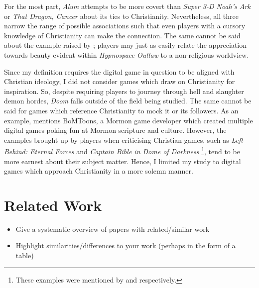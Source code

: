 For the most part, \textit{Alum} attempts to be more covert than \textit{Super 3-D Noah's Ark} \parencite{wisdom_tree_super_2014} or \textit{That Dragon, Cancer} \parencite{numinous_games_that_2016} about its ties to Christianity. Nevertheless, all three narrow the range of possible associations such that even players with a cursory knowledge of Christianity can make the connection. The same cannot be said about the example raised by \textcite{hartgrove_why_2022}; players may just as easily relate the appreciation towards beauty evident within \textit{Hypnospace Outlaw} \parencite{tholen_hypnospace_2019} to a non-religious worldview.

Since my definition requires the digital game in question to be aligned with Christian ideology, I did not consider games which draw on Christianity for inspiration. So, despite requiring players to journey through hell and slaughter demon hordes, \textit{Doom} \parencite{id_software_doom_1993} falls outside of the field being studied. The same cannot be said for games which reference Christianity to mock it or its followers. As an example, \textcite[120]{gonzalez_born-again_2014} mentions BoMToons, a Mormon game developer which created multiple digital games poking fun at Mormon scripture and culture. However, the examples brought up by players when criticising Christian games, such as \textit{Left Behind: Eternal Forces} \parencite{inspired_media_entertainment_left_2006} and \textit{Captain Bible in Dome of Darkness} \parencite{engelbrite_captain_1994}\footnote{These examples were mentioned by \textcite{hartgrove_why_2022} and \textcite{moon_channel_why_2023} respectively.}, tend to be more earnest about their subject matter. Hence, I limited my study to digital games which approach Christianity in a more solemn manner.

\section{Related Work}

  \begin{itemize}
   \item Give a systematic overview of papers with related/similar work
   \item Highlight similarities/differences to your work (perhaps in the form of a table)
  \end{itemize}

